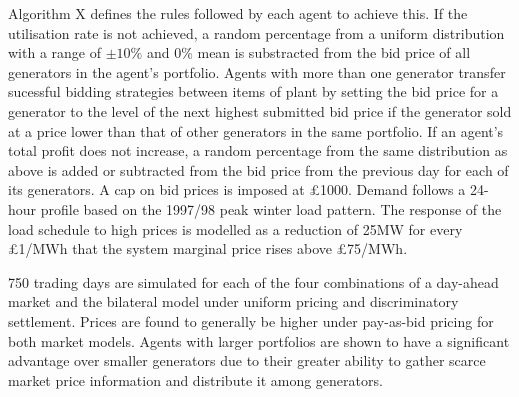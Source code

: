 Algorithm X
defines the rules followed by each agent to achieve this.  If the utilisation
rate is not achieved, a random percentage from a uniform distribution with a
range of $\pm10\%$ and $0\%$ mean is substracted from the bid price of all
generators in the agent's portfolio.  Agents with more than one generator
transfer sucessful bidding strategies between items of plant by setting the bid
price for a generator to the level of the next highest submitted bid price if
the generator sold at a price lower than that of other generators in the same
portfolio.  If an agent's total profit does not increase, a random percentage
from the same distribution as above is added or subtracted from the bid price
from the previous day for each of its generators.  A cap on bid prices is
imposed at \pounds1000.  Demand follows a 24-hour profile based on the 1997/98
peak winter load pattern.  The response of the load schedule to high prices is
modelled as a reduction of 25MW for every \pounds1/MWh that the system marginal
price rises above \pounds75/MWh.

750 trading days are simulated for each of the four combinations of a day-ahead
market and the bilateral model under uniform pricing and discriminatory
settlement.  Prices are found to generally be higher under pay-as-bid pricing
for both market models.  Agents with larger portfolios are shown to have a
significant advantage over smaller generators due to their greater ability to
gather scarce market price information and distribute it among generators.

